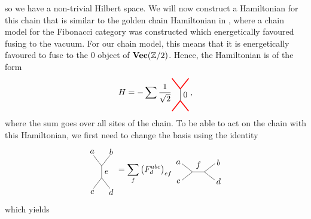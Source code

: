 \noindent
so we have a non-trivial Hilbert space. We will now construct a Hamiltonian for this chain that is similar to the golden chain Hamiltonian in \cite{Feiguin2007}, where a chain model for the Fibonacci category was constructed which energetically favoured fusing to the vacuum. For our chain model, this means that it is energetically favoured to fuse to the $0$ object of $\textbf{Vec}(\mathbb{Z}/2)$. Hence, the Hamiltonian is of the form
	\begin{equation}
		H=-\sum \frac{1}{\sqrt{2}}
		\begin{tikzpicture}[scale=0.5,baseline=(current bounding box.center)]
			\draw[red,line width=0.4mm] (0,0) -- (-0.7,0.9);
			\draw[red,line width=0.4mm] (0,0) -- (0.7,0.9);
			\draw (0,0) to node[right] {$0$} (0,-1);
			\draw[red,line width=0.4mm] (0,-1) -- (-0.7,-1.9);
			\draw[red,line width=0.4mm] (0,-1) -- (0.7,-1.9);
		\end{tikzpicture},
	\end{equation}
where the sum goes over all sites of the chain. To be able to act on the chain with this Hamiltonian, we first need to change the basis using the identity
	\begin{equation}
		\begin{tikzpicture}[scale=0.5,baseline=(current bounding box.center)]
			\draw (0,0) -- (-0.7,0.9);
			\draw (0,0) -- (0.7,0.9);
			\draw (0,0) to node[right] {$e$} (0,-1);
			\draw (0,-1) -- (-0.7,-1.9);
			\draw (0,-1) -- (0.7,-1.9);
			\node at (0.8,1.2) {$b$};
			\node at (-0.8,1.2) {$a$};
			\node at (0.8,-2.2) {$d$};
			\node at (-0.8,-2.2) {$c$};
		\end{tikzpicture}=\sum_f\left(F_d^{abc}\right)_{ef}
		\begin{tikzpicture}[scale=0.5,baseline=(current bounding box.center)]
			\draw (0,0) -- (-0.9,0.7);
			\draw (0,0) -- (-0.9,-0.7);
			\draw (0,0) to node[above] {$f$} (1,0);
			\draw (1,0) -- (1.9,0.7);
			\draw (1,0) -- (1.9,-0.7);
			\node at (-1.2,0.8) {$a$};
			\node at (-1.2,-0.8) {$c$};
			\node at (2.2,0.8) {$b$};
			\node at (2.2,-0.8) {$d$};
		\end{tikzpicture}
	\end{equation}
which yields
